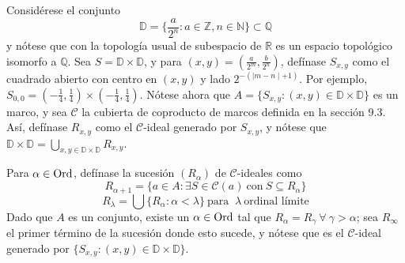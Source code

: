 \begin{example}
Considérese el conjunto 
$$\mathbb{D}=\{\frac{a}{2^n}:a\in\mathbb{Z},n\in\mathbb{N}\}\subset\mathbb{Q}$$
y nótese que con la topología usual de subespacio de $\mathbb{R}$ es un espacio topológico isomorfo a $\mathbb{Q}$. Sea $S=\mathbb{D}\times\mathbb{D}$, y para $(x,y)=(\frac{a}{2^m},\frac{b}{2^n})$, defínase $S_{x,y}$ como el cuadrado abierto con centro en $(x,y)$ y lado $2^{-(\mid m-n\mid+1)}$. Por ejemplo, $S_{0,0}=(-\tfrac{1}{4},\tfrac{1}{4})\times (-\tfrac{1}{4},\tfrac{1}{4})$.
Nótese ahora que $A=\{S_{x,y}:(x,y)\in\mathbb{D}\times\mathbb{D}\}$ es un marco, y sea $\mathcal{C}$ la cubierta de coproducto de marcos definida en la sección 9.3. Así, defínase $R_{x,y}$ como el $\mathcal{C}$-ideal generado por $S_{x,y}$, y nótese que $\mathbb{D}\times\mathbb{D}=\bigcup\limits_{x,y\in\mathbb{D}\times\mathbb{D}}R_{x,y}$.

Para $\alpha\in\mathrm{Ord}$, defínase la sucesión $(R_\alpha)$ de $\mathcal{C}$-ideales como 
$$R_{\alpha+1}=\{a\in A : \exists S\in \mathcal{C}(a) \ \text{con} \ S\subseteq R_\alpha\}$$
$$ R_\lambda =\bigcup\{R_\alpha : \alpha<\lambda\} \ \text{para } \ \lambda \ \text{ordinal límite}$$
Dado que $A$ es un conjunto, existe un $\alpha\in\mathrm{Ord}$ tal que $R_\alpha=R_\gamma \ \forall \ \gamma>\alpha$; sea $R_\infty$ el primer término de la sucesión donde esto sucede, y nótese que es el $\mathcal{C}$-ideal generado por $\{S_{x,y}:(x,y)\in\mathbb{D}\times\mathbb{D}\}$.


\end{example}
